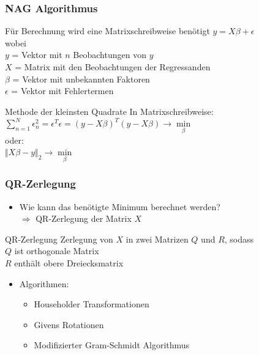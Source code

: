 \documentclass{beamer}
\begin{document}
\begin{frame}
  \frametitle{NAG Algorithmus}
 
  \begin{block}{Für Berechnung wird eine Matrixschreibweise benötigt}
    {\centering $y = X \beta + \epsilon$ \\}
    wobei \\
    \qquad $y$ = Vektor mit $n$ Beobachtungen von $y$ \\
    \qquad $X$ = Matrix mit den Beobachtungen der Regressanden \\
    \qquad $\beta$ = Vektor mit unbekannten Faktoren \\
    \qquad $\epsilon$ = Vektor mit Fehlertermen \\
  \end{block}
  
  \pause
  
  \begin{block}{Methode der kleinsten Quadrate}
    In Matrixschreibweise:\\
    {\centering
      $\sum\limits^{N}_{n=1} \epsilon^2_n = \epsilon^T \epsilon = (y - X \beta)^T (y - X \beta) \rightarrow \min\limits_{\beta}$\\}
    oder: \\
    {\centering
      $\Vert X\beta - y \Vert_2 \rightarrow \min\limits_{\beta}$
      \\}
  \end{block}

\end{frame}



\begin{frame}
  \frametitle{QR-Zerlegung}
  
  \begin{itemize}
  \item Wie kann das benötigte Minimum berechnet werden?\\
    $\Rightarrow$ QR-Zerlegung der Matrix $X$
  \end{itemize}

  \begin{block}{QR-Zerlegung}
    Zerlegung von $X$ in zwei Matrizen $Q$ und $R$, sodass \\
    \qquad $Q$ ist orthogonale Matrix \\
    \qquad $R$ enthält obere Dreiecksmatrix \\
  \end{block}

  \pause

  \begin{itemize}
  \item Algorithmen:
    \begin{itemize}
    \item Householder Transformationen 
    \item Givens Rotationen 
    \item Modifizierter Gram-Schmidt Algorithmus 
    \end{itemize}
  \end{itemize}

\end{frame}
\end{document}
